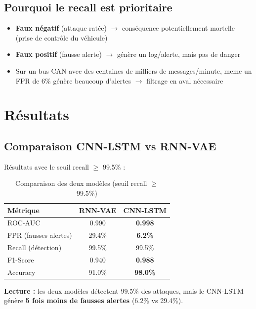 \documentclass[12pt,a4paper]{article}
\begin{document}
\subsection{Pourquoi le recall est prioritaire}

\begin{itemize}[noitemsep]
    \item \textbf{Faux négatif} (attaque ratée) $\to$ conséquence potentiellement mortelle (prise de contrôle du véhicule)
    \item \textbf{Faux positif} (fausse alerte) $\to$ génère un log/alerte, mais pas de danger
    \item Sur un bus CAN avec des centaines de milliers de messages/minute, meme un FPR de 6\% génère beaucoup d'alertes $\to$ filtrage en aval nécessaire
\end{itemize}

\section{Résultats}

\subsection{Comparaison CNN-LSTM vs RNN-VAE}

Résultats avec le seuil recall $\geq$ 99.5\% :

\begin{table}[H]
\centering
\begin{tabular}{lcc}
\toprule
\textbf{Métrique} & \textbf{RNN-VAE} & \textbf{CNN-LSTM} \\
\midrule
ROC-AUC & 0.990 & \textbf{0.998} \\
FPR (fausses alertes) & 29.4\% & \textbf{6.2\%} \\
Recall (détection) & 99.5\% & 99.5\% \\
F1-Score & 0.940 & \textbf{0.988} \\
Accuracy & 91.0\% & \textbf{98.0\%} \\
\bottomrule
\end{tabular}
\caption{Comparaison des deux modèles (seuil recall $\geq$ 99.5\%)}
\end{table}

\textbf{Lecture :} les deux modèles détectent 99.5\% des attaques, mais le CNN-LSTM génère \textbf{5 fois moins de fausses alertes} (6.2\% vs 29.4\%).
\end{document}
